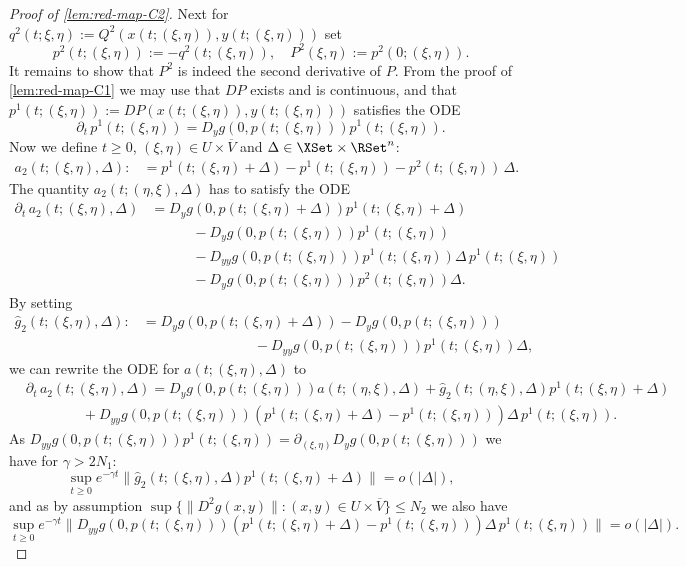 \documentclass[a4paper]{siamart190516}
\begin{document}
\begin{proof}[Proof of \cref{lem:red-map-C2}]
Next for $q^2(t;\xi,\eta) := Q^2(x(t;(\xi,\eta)),y(t;(\xi,\eta)))$ set 
\[
p^2(t;(\xi,\eta)) := - q^2(t;(\xi,\eta)), \quad P^2(\xi,\eta) := p^2(0;(\xi,\eta)).
\]
It remains to show that $P^2$ is indeed the second derivative of $P$. From the proof
of \cref{lem:red-map-C1} we may use that $DP$ exists and is continuous,
and that $p^1(t;(\xi,\eta)) := DP(x(t;(\xi,\eta)),y(t;(\xi,\eta)))$ satisfies the ODE
\[
\partial_t \, p^1(t;(\xi,\eta)) = D_y g(0,p(t;(\xi,\eta))) p^1(t;(\xi,\eta)).
\]
Now we define $t \geq 0$, $(\xi,\eta) \in U \times \overline{V}$ and $\Delta \in \XSet \times \RSet^n$:
\begin{align*}
a_2(t; (\xi,\eta), \Delta) :&= p^1(t; (\xi,\eta) + \Delta) - p^1(t; (\xi,\eta)) - p^2(t; (\xi,\eta)) \, \Delta.
\end{align*}
The quantity $a_2(t; (\eta,\xi), \Delta)$ has to satisfy the ODE
\begin{equation}
\begin{aligned}\label{eq:a2-ODE}
\partial_t  \, a_2(t; (\xi,\eta), \Delta) & = D_y   g(0,p(t;(\xi,\eta)+\Delta)) p^1(t; (\xi,\eta) + \Delta) \\
&\qquad \quad - D_y g(0,p(t;(\xi,\eta))) p^1(t; (\xi,\eta)) \\
&\qquad \quad  - D_{yy} g(0,p(t;(\xi,\eta))) p^1(t;(\xi,\eta)) \Delta \, p^1(t;(\xi,\eta))  \\
&\qquad \quad  -    D_y g(0,p(t;(\xi,\eta)))  p^2(t;(\xi,\eta)) \Delta.
\end{aligned}
\end{equation}
By setting
\begin{align*}
\hat{g}_2(t; (\xi,\eta), \Delta) :&= D_y g(0,p(t;(\xi,\eta)+\Delta)) - D_y g(0,p(t;(\xi,\eta)))   \\
&\qquad \qquad \qquad \qquad - D_{yy} g(0,p(t;(\xi,\eta)))  p^1(t;(\xi,\eta))  \Delta,
\end{align*}
we can rewrite the ODE for $a(t; (\xi,\eta), \Delta)$ to
\begin{align*}
&\partial_t \, a_2(t; (\xi,\eta), \Delta) =  D_y g(0,p(t;(\xi,\eta))) a(t; (\eta,\xi), \Delta) + \hat{g}_2(t; (\eta,\xi), \Delta) p^1(t; (\xi,\eta) + \Delta)  \\
&\qquad \qquad + D_{yy} g(0,p(t;(\xi,\eta))) \left( p^1(t; (\xi,\eta) + \Delta)  - p^1(t;(\xi,\eta)) \right) \Delta \, p^1(t;(\xi,\eta)).
\end{align*}
As $D_{yy} g(0,p(t;(\xi,\eta))) p^1(t;(\xi,\eta)) = \partial_{(\xi,\eta)} D_y g(0,p(t;(\xi,\eta)))$ we have for $\gamma > 2N_1$:
\[
\sup_{t \geq 0} e^{-\gamma t} \| \hat{g}_2(t; (\xi,\eta), \Delta) p^1(t; (\xi,\eta) + \Delta)  \| = o(|\Delta|),
\]
and as by assumption $\sup \{\|D^2 g(x,y)\| : (x,y) \in U \times \overline{V} \} \leq N_2$ we also have
\[
\sup_{t \geq 0} e^{-\gamma t}  \| D_{yy} g(0,p(t;(\xi,\eta))) \left( p^1(t; (\xi,\eta) + \Delta)  - p^1(t;(\xi,\eta)) \right) \Delta \,  p^1(t;(\xi,\eta)) \| = o(|\Delta|).
\]


\end{proof}
\end{document}
